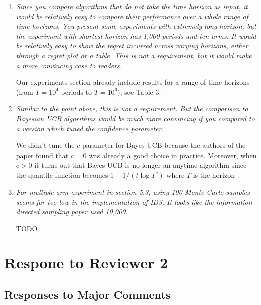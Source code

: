 \documentclass[11pt]{article}
\newcommand{\1}{\ensuremath{\mathbf{1}}} %
\theoremstyle{thm-sf}
\begin{document}
	\begin{enumerate}
		\item {\it Since you compare algorithms that do not take the time horizon as input, it would be relatively easy to compare their performance over a whole range of time horizons. You present some experiments with extremely long horizon, but the experiment with shortest horizon has 1,000 periods and ten arms. It would be relatively easy to show the regret incurred across varying horizons, either through a regret plot or a table. This is not a requirement, but it would make a more convincing case to readers.}
		
		Our experiments section already include results for a range of time horizons (from $T=10^4$ periods to $T = 10^6$); see Table 3. 
		
		\item {\it Similar to the point above, this is not a requirement. But the comparison to Bayesian UCB algorithms would be much more convincing if you compared to a version which tuned the confidence parameter.}
		
		We didn't tune the $c$ parameter for  Bayes UCB because the authors of the paper found that $c=0$ was already a good choice in practice. Moreover, when $c > 0$ it turns out that Bayes UCB is no longer an anytime algorithm since the quantile function becomes $1 - 1/(t\log T^c)$ where $T$ is the horizon \citep{kaufmann2012bayesian}.
		
		\item {\it For multiple arm experiment in section 5.3, using 100 Monte Carlo samples seems far too low in the implementation of IDS. It looks like the information-directed sampling paper used 10,000.}
		
		TODO
	\end{enumerate}

	\newpage
	\section{Respone to Reviewer 2}
	
	\subsection{Responses to Major Comments}
	
\end{document}
